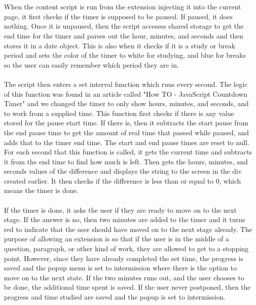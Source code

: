 \documentclass[12pt]{article}
\begin{document}
\\\\When the content script is run from the extension injecting it into the current page, it first checks if the timer is supposed to be paused. If paused, it does nothing. Once it is unpaused, then
the script accesses shared storage to get the end time for the timer and parses out the hour, minutes, and seconds and then stores it in a date object. 
This is also when it checks if it is a study or break period and sets the color of the timer to white for studying, and blue for breaks so the user can easily remember which period they are in. \\\\
\indent The script then enters a set interval function which runs every second. The logic of this function was found in an article called "How TO - JavaScript Countdown Timer" and we changed the timer to only show hours, minutes, and seconds, and to work from a supplied time.
This function first checks if there is any value stored for the pause start time. If there is,
then it subtracts the start pause from the end pause time to get the amount of real time that passed while paused, and adds that to the timer end time.
The start and end pause times are reset to null. For each second that this function is called, it gets the current time and subtracts it from the
end time to find how much is left. Then gets the hours, minutes, and seconds values of the difference and displays the string to the screen in the div created earlier.
It then checks if the difference is less than or equal to 0, which means the timer is done.
\\\\\indent If the timer is done, it asks the user if they are ready to move on to the next stage. 
If the answer is no, then two minutes are added to the timer and it turns red to indicate that the user should have moved on to the next stage already. The purpose of allowing an extension is so that if the user is in the middle of a question, paragraph, or other kind of work, 
they are allowed to get to a stopping point. However, since they have already completed the set time, the progress is saved and the popup menu is set to intermission where there is the option to move on to the next state. 
If the two minutes runs out, and the user chooses to be done, the additional time spent is saved. 
If the user never postponed, then the progress and time studied are saved and the popup is set to intermission. \\
\end{document}
